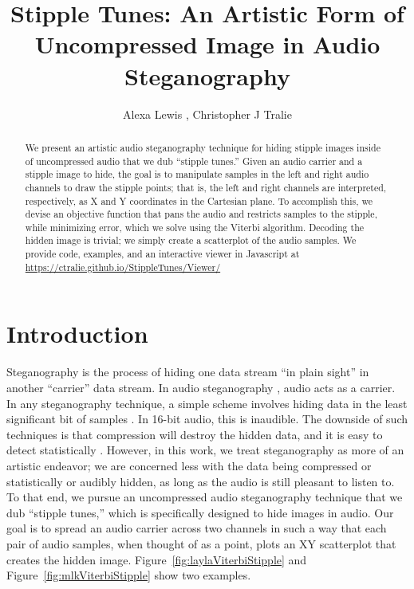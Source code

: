 \documentclass[runningheads]{llncs}
\title{Stipple Tunes: An Artistic Form of Uncompressed Image in Audio Steganography}
\institute{Ursinus College, Department of Mathematics And Computer Science, Collegeville, PA, USA}
\author{Alexa Lewis \inst{1}, Christopher J Tralie\inst{1}\orcidID{0000-0003-4206-1963}}
\begin{document}
%
\maketitle
%
\begin{abstract}
  We present an artistic audio steganography technique for hiding stipple images inside of uncompressed audio that we dub ``stipple tunes.''  Given an audio carrier and a stipple image to hide, the goal is to manipulate samples in the left and right audio channels to draw the stipple points; that is, the left and right channels are interpreted, respectively, as X and Y coordinates in the Cartesian plane.  To accomplish this, we devise an objective function that pans the audio and restricts samples to the stipple, while minimizing error, which we solve using the Viterbi algorithm.  Decoding the hidden image is trivial; we simply create a scatterplot of the audio samples.  We provide code, examples, and an interactive viewer in Javascript at \url{https://ctralie.github.io/StippleTunes/Viewer/}

\end{abstract}
%
\section{Introduction}\label{sec:introduction}

Steganography is the process of hiding one data stream ``in plain sight'' in another ``carrier'' data stream.  In audio steganography \cite{djebbar_comparative_2012}\cite{dutta_overview_2020}, audio acts as a carrier.  In any steganography technique, a simple scheme involves hiding data in the least significant bit of samples \cite{cvejic_wavelet_2002}.  In 16-bit audio, this is inaudible.  The downside of such techniques is that compression will destroy the hidden data, and it is easy to detect statistically \cite{fridrich2001reliable}.  However, in this work, we treat steganography as more of an artistic endeavor; we are concerned less with the data being compressed or statistically or audibly hidden, as long as the audio is still pleasant to listen to.  To that end, we pursue an uncompressed audio steganography technique that we dub ``stipple tunes,'' which is specifically designed to hide images in audio.  Our goal is to spread an audio carrier across two channels in such a way that each pair of audio samples, when thought of as a point, plots an XY scatterplot that creates the hidden image.  Figure~\ref{fig:laylaViterbiStipple} and Figure~\ref{fig:mlkViterbiStipple} show two examples.  
\end{document}
